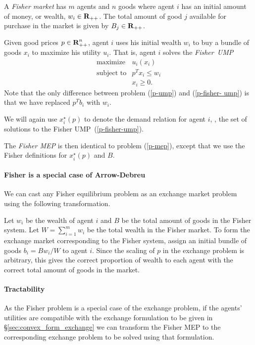 \documentclass[12pt]{article}
\begin{document}
A \emph{Fisher market} has $m$ agents and $n$ goods where agent $i$ has an
initial amount of money, or wealth, $w_i \in {\mbox{\bf R}}_{++}$. The total amount of
good $j$ available for purchase in the market is given by $B_j \in
{\mbox{\bf R}}_{++}$.

Given good prices $p \in {\mbox{\bf R}}^n_{++}$, agent $i$ uses his initial wealth
$w_i$ to buy a bundle of goods $x_i$ to maximize his utility $u_i$. That is,
agent $i$ solves the \emph{Fisher~UMP}
\begin{equation}
\label{p-fisher-ump}
\begin{array}{ll}
\mbox{maximize} & u_i(x_i) \\
\mbox{subject to} & p^T x_i \leq w_i \\
& x_i \geq 0.
\end{array}
\end{equation}
Note that the only difference between problem (\ref{p-ump}) and
(\ref{p-fisher- ump}) is that we have replaced $p^T b_i$ with $w_i$.

We will again use $x^\star_i(p)$ to denote the demand relation for agent $i$,
\ie, the set of solutions to the Fisher UMP~(\ref{p-fisher-ump}).

The \emph{Fisher MEP} is then identical to problem (\ref{p-mep}), except that
we use  the Fisher definitions for $x^\star_i(p)$ and $B$.


\paragraph{Fisher is a special case of Arrow-Debreu}

We can cast any Fisher equilibrium problem as an exchange market problem using
the following transformation.

Let $w_i$ be the wealth of agent $i$ and $B$ be the total amount of goods in
the Fisher system. Let $W = \sum_{i=1}^m w_i$ be the total wealth in the Fisher
market. To form the exchange market corresponding to the Fisher system, assign
an initial bundle of goods $b_i = B w_i/W$ to agent $i$. Since the scaling of
$p$ in the exchange problem is arbitrary, this gives the correct proportion of
wealth to each agent with the correct total amount of goods in the market.


\paragraph{Tractability}

As the Fisher problem is a special case of the exchange problem, if the agents'
utilities are compatible with the exchange formulation to be given in
\S\ref{sec:convex_form_exchange} we can transform the Fisher MEP to the
corresponding exchange problem to be solved using that formulation.
\end{document}
